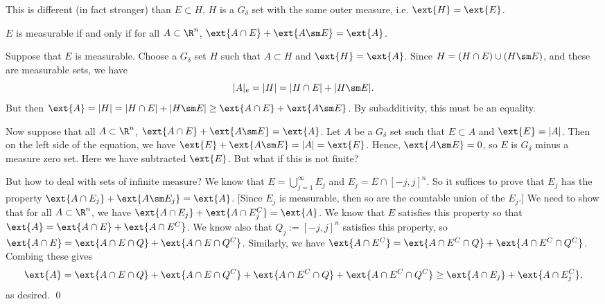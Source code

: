 
\begin{rem}
This is different (in fact stronger) than $E \subset H$, $H$ is a $G_\delta$ set with the same outer measure, i.e. $\ext{H}=\ext{E}$. 
\end{rem}

\begin{thm}
$E$ is measurable if and only if for all $A \subset \R^n$, $\ext{A \cap E}+\ext{A\sm E}=\ext{A}$.
\end{thm}

\pf Suppose that $E$ is measurable. Choose a $G_\delta$ set $H$ such that $A \subset H$ and $\ext{H}=\ext{A}$. Since $H= (H \cap E) \cup (H \sm E)$, and these are measurable sets, we have
	\[
	|A|_e=|H|= |H \cap E| + |H \sm E|.
	\]
But then $\ext{A} = |H|= |H \cap E| + |H\sm E| \geq \ext{A \cap E} + \ext{A \sm E}$. By subadditivity, this must be an equality. 

Now suppose that all $A \subset \R^n$, $\ext{A \cap E}+\ext{A\sm E}=\ext{A}$. Let $A$ be a $G_\delta$ set such that $E \subset A$ and $\ext{E}=|A|$. Then on the left side of the equation, we have $\ext{E}+\ext{A\sm E}= |A|=\ext{E}$. Hence, $\ext{A \sm E}=0$, so $E$ is $G_\delta$ minus a measure zero set. Here we have subtracted $\ext{E}$. But what if this is not finite? 

But how to deal with sets of infinite measure? We know that $E= \bigcup_{j=1}^\infty E_j$ and $E_j= E \cap [-j,j]^n$. So it suffices to prove that $E_j$ has the property $\ext{A \cap E_j}+\ext{A\sm E_j}=\ext{A}$. [Since $E_j$ is measurable, then so are the countable union of the $E_j$.] We need to show that for all $A \subset \R^n$, we have $\ext{A \cap E_j} + \ext{A \cap E_j^C}=\ext{A}$. We know that $E$ satisfies this property so that $\ext{A}= \ext{A \cap E} + \ext{A \cap E^C}$. We know also that $Q_j:= [-j,j]^n$ satisfies this property, so $\ext{A \cap E}= \ext{A \cap E \cap Q}+ \ext{A \cap E \cap Q^C}$. Similarly, we have $\ext{A \cap E^C}= \ext{A \cap E^C \cap Q}+ \ext{A \cap E^C \cap Q^C}$. Combing these gives
	\[
	\ext{A}= \ext{A \cap E \cap Q} + \ext{A \cap E \cap Q^C} + \ext{A \cap E^C \cap Q}+ \ext{A \cap E^C \cap Q^C} \geq \ext{A \cap E_j} + \ext{A \cap E_j^C},
	\]
as desired. \qed \\


